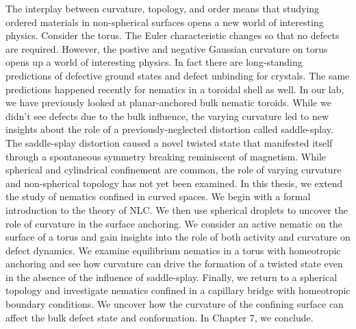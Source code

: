 The interplay between curvature, topology, and order means that studying ordered materials in non-spherical surfaces opens a new world of interesting physics.
Consider the torus.
The Euler characteristic changes so that no defects are required.
However, the postive and negative Gaussian curvature on torus opens up a world of interesting physics.
In fact there are long-standing predictions of defective ground states and defect unbinding for crystals.
The same predictions happened recently for nematics in a toroidal shell as well.
In our lab, we have previously looked at planar-anchored bulk nematic toroids.
While we didn't see defects due to the bulk influence, the varying curvature led to new insights about the role of a previously-neglected distortion called saddle-splay.
The saddle-splay distortion caused a novel twisted state that manifested itself through a spontaneous symmetry breaking reminiscent of magnetism.
While spherical and cylindrical confinement are common, the role of varying curvature and non-spherical topology has not yet been examined.
In this thesis, we extend the study of nematics confined in curved spaces.
We begin with a formal introduction to the theory of NLC.
We then use spherical droplets to uncover the role of curvature in the surface anchoring.
We consider an active nematic on the surface of a torus and gain insights into the role of both activity and curvature on defect dynamics.
We examine equilibrium nematics in a torus with homeotropic anchoring and see how curvature can drive the formation of a twisted state even in the absence of the influence of saddle-splay.
Finally, we return to a spherical topology and investigate nematics confined in a capillary bridge with homeotropic boundary conditions.
We uncover how the curvature of the confining surface can affect the bulk defect state and conformation.
In Chapter 7, we conclude. 

